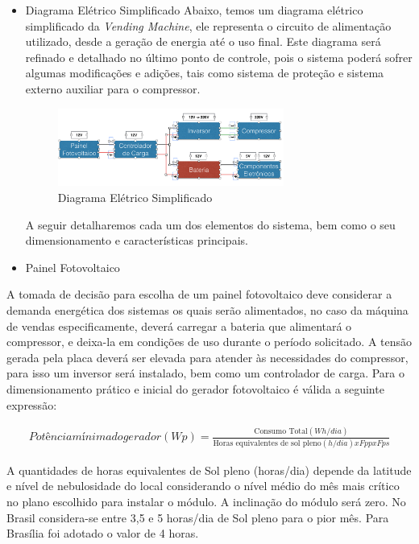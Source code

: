   \begin{itemize}
    \item Diagrama Elétrico Simplificado
    	Abaixo, temos um diagrama elétrico simplificado da \textit{Vending Machine}, ele representa o circuito de alimentação utilizado, desde a geração de energia até o uso final. Este diagrama será refinado e detalhado no último ponto de controle, pois o sistema poderá sofrer algumas modificações e adições, tais como sistema de proteção e sistema externo auxiliar para o compressor.

       \begin{figure}[H]
    \centering
    \includegraphics[width=0.7\textwidth]{figuras/diagrama_simplificado}
    \caption{Diagrama Elétrico Simplificado}
    \label{fig:diagrama_simplificado}
\end{figure}

		A seguir detalharemos cada um dos elementos do sistema, bem como o seu dimensionamento e características principais.

\end{itemize}


\begin{itemize}
\item Painel Fotovoltaico
\end{itemize}
		A tomada de decisão para escolha de um painel fotovoltaico deve considerar a demanda energética dos sistemas os quais serão alimentados, no caso da máquina de vendas especificamente, deverá carregar a bateria que alimentará o compressor, e deixa-la em condições de uso durante o período solicitado. A tensão gerada pela placa deverá ser elevada para atender às necessidades do compressor, para isso um inversor será instalado, bem como um controlador de carga.
        Para o dimensionamento prático e inicial do gerador fotovoltaico é válida a seguinte expressão:

\begin{eqnarray}
Potência mínima do gerador (Wp) = \frac{\text{Consumo Total}(Wh/dia) }{\text{Horas equivalentes de sol pleno} (h/dia) x Fpp x Fps}
\end{eqnarray}

        A quantidades de horas equivalentes de Sol pleno (horas/dia) depende da latitude e nível de nebulosidade do local considerando o nível médio do mês mais crítico no plano escolhido para instalar o módulo. A inclinação do módulo será zero. No Brasil considera-se entre 3,5 e 5 horas/dia de Sol pleno para o pior mês. Para Brasília foi adotado o valor de 4 horas.

